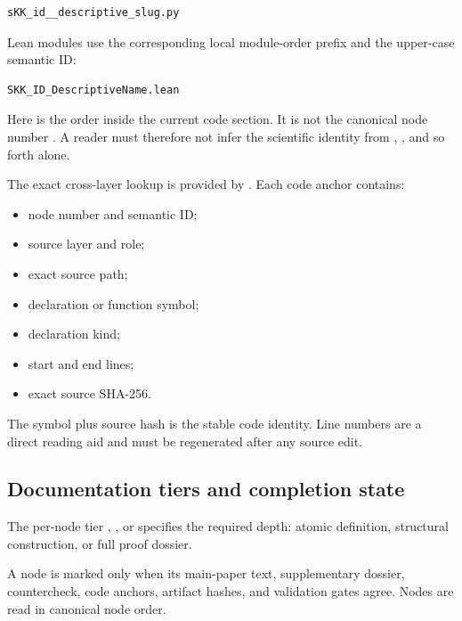 \begin{verbatim}
sKK_id__descriptive_slug.py
\end{verbatim}

Lean modules use the corresponding local module-order prefix and the
upper-case semantic ID:

\begin{verbatim}
SKK_ID_DescriptiveName.lean
\end{verbatim}

Here \texttt{\protect{}} is the order inside the current code section. It is not
the canonical node number \texttt{\protect{}}. A reader must therefore not
infer the scientific identity from \texttt{\protect{}}, \texttt{\protect{}}, and so
forth alone.

The exact cross-layer lookup is provided by
\texttt{\protect{}}. Each code
anchor contains:

\begin{itemize}
\tightlist
\item
  node number and semantic ID;
\item
  source layer and role;
\item
  exact source path;
\item
  declaration or function symbol;
\item
  declaration kind;
\item
  start and end lines;
\item
  exact source SHA-256.
\end{itemize}

The symbol plus source hash is the stable code identity. Line numbers
are a direct reading aid and must be regenerated after any source edit.

\subsection{Documentation tiers and completion
state}\label{documentation-tiers-and-completion-state}

The per-node tier \texttt{\protect{}}, \texttt{\protect{}}, or \texttt{\protect{}} specifies the
required depth: atomic definition, structural construction, or full
proof dossier.

A node is marked \texttt{\protect{}} only when its main-paper text,
supplementary dossier, countercheck, code anchors, artifact hashes, and
validation gates agree. Nodes are read in canonical node order.

